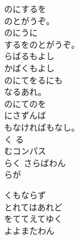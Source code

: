 \documentclass[10pt,b5j]{tarticle} %
\begin{document}
\vspace{1.5em} %
\newcommand{\linespace}{0.5em} %
\newcommand{\blocksize}{0.5\hsize} %
\begin{enumerate} %
    \begin{minipage}[c]{\blocksize}
    
        \vspace{\linespace}
        \item
        のにするを\\
        のとがうぞ。\\
        のにうに\\
        するをのとがうぞ。\\
        らばるもよし\\
        かばくもよし\\
        のにてをるにも\\
        なるあれ。\\
        のにてのを\\
        にさずんば\\
        もなければもなし。\\
        く る\\
        むコンパス\\
        らく さらばわん\\
        らが
        
        \vspace{\linespace}
        \item
        くもならず\\
        とれてはあれど\\
        をててえてゆく\\
        よよまたわん
        

\end{minipage}
\end{enumerate}
\end{document}
